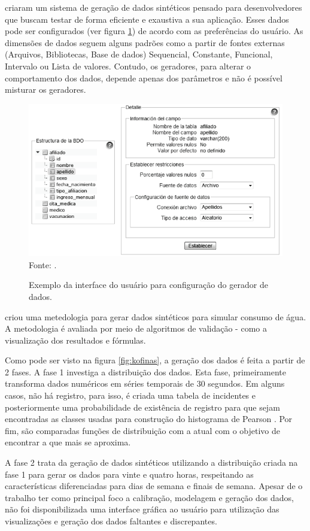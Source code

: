 \documentclass[
	12pt,				%
	openright,			%
	oneside,			%
	a4paper,			%
	english,			%
	brazil				%
	]{abntex2}
\begin{document}
		\cite{garcia2011prototype} criaram um sistema de geração de dados sintéticos pensado para desenvolvedores que buscam testar de forma eficiente e exaustiva a sua aplicação. Esses dados pode ser configurados (ver figura \ref{fig:garcia}) de acordo com as preferências do usuário. As dimensões de dados seguem alguns padrões como a partir de fontes externas (Arquivos, Bibliotecas, Base de dados) Sequencial, Constante, Funcional, Intervalo ou Lista de valores. Contudo, os geradores, para alterar o comportamento dos dados, depende apenas dos parâmetros e não é possível misturar os geradores.
		\begin{figure}[h!]
			\centering
			\caption{Exemplo da interface do usuário para configuração do gerador de dados.}
			\includegraphics[width=\linewidth]{./figures/TrabalhosRelacionados/Garcia18.png}
			\label{fig:garcia}
			\footnotesize Fonte: \cite{garcia2011prototype}.
		\end{figure}

		\cite{kofinas2018methodology} criou uma metedologia para gerar dados sintéticos para simular consumo de água.
		A metodologia é avaliada por meio de algoritmos de validação - como a visualização dos resultados e fórmulas.
		\par
		Como pode ser visto na figura \ref{fig:kofinas}, a geração dos dados é feita a partir de 2 fases.
		A fase 1 investiga a distribuição dos dados.
		Esta fase, primeiramente transforma dados numéricos em séries temporais de 30 segundos.
		Em alguns casos, não há registro, para isso, é criada uma tabela de incidentes e posteriormente uma probabilidade de existência de registro para que sejam encontradas as classes usadas para construção do histograma de Pearson \cite{dean2009descriptive}. 
		Por fim, são comparadas funções de distribuição com a atual com o objetivo de encontrar a que mais se aproxima.
		\par
		A fase 2 trata da geração de dados sintéticos utilizando a distribuição criada na fase 1 para gerar os dados para vinte e quatro horas, respeitando as características diferenciadas para dias de semana e finais de semana.
		Apesar de o trabalho ter como principal foco a calibração, modelagem e geração dos dados, não foi disponibilizada uma interface gráfica ao usuário para utilização das visualizações e geração dos dados faltantes e discrepantes.
		\par
		
\end{document}
